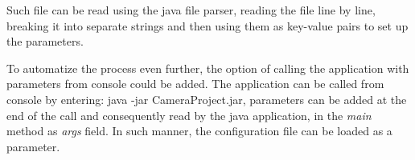 \documentclass[english,12pt,a4paper,pdftex,elec,utf8]{aaltothesis}
\begin{document}
Such file can be read using the java file parser, reading the file line by line, breaking it into separate strings and then using them as key-value pairs to set up the parameters.

To automatize the process even further, the option of calling the application with parameters from console could be added. The application can be called from console by entering: java -jar CameraProject.jar, parameters can be added at the end of the call and consequently read by the java application, in the \textit{main} method as \textit{args} field. In such manner, the configuration file can be loaded as a parameter.

\clearpage
\end{document}
